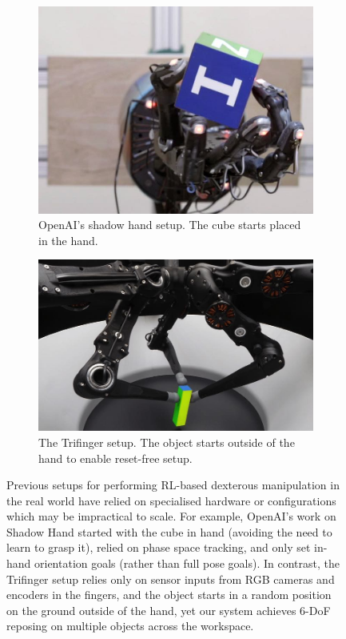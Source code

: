\documentclass[letterpaper, 10 pt, conference]{ieeeconf}  %
\begin{document}
\setcounter{figure}{1}
\begin{figure}[!t]
\centering
\begin{subfigure}{.50\linewidth}
  \centering
  \includegraphics[trim={0.7 1.5cm 0.4 1.5cm},clip,width=.85\linewidth]{figure/misc/shadow_hand_setup.jpg}
  \caption{OpenAI's shadow hand setup. The cube starts placed in the hand.}
  \vspace{3mm}
\end{subfigure}%
\hfill
\begin{subfigure}{.46\linewidth}
  \centering
  \includegraphics[width=.9\linewidth]{figure/misc/trifinger_setup.jpg}
  \caption{The Trifinger setup. The object starts outside of the hand to enable reset-free setup.}
\end{subfigure}
\caption{Previous setups for performing RL-based dexterous manipulation in the real world have relied on specialised hardware or configurations which may be impractical to scale. For example, OpenAI's work on Shadow Hand \citep{openai-sh} started with the cube in hand (avoiding the need to learn to grasp it), relied on phase space tracking, and only set in-hand orientation goals (rather than full pose goals). In contrast, the Trifinger setup relies only on sensor inputs from RGB cameras and encoders in the fingers, and the object starts in a random position on the ground outside of the hand, yet our system achieves 6-DoF reposing on multiple objects across the workspace.}
\label{fig:comparison-shadow-trifinger}
\end{figure}
\end{document}
